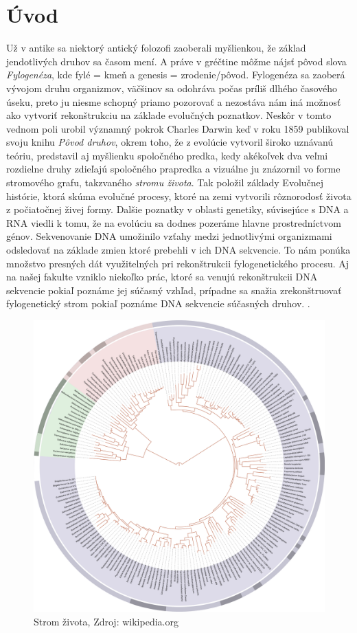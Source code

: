 \chapter*{Úvod}
Už v antike sa niektorý antický folozofi zaoberali myšlienkou, že základ jendotlivých druhov sa časom mení.
A práve v gréčtine môžme nájsť pôvod slova \emph{Fylogenéza}, kde fylé = kmeň a genesis = zrodenie/pôvod.
Fylogenéza sa zaoberá vývojom druhu organizmov, väčšinov sa odohráva počas príliš dlhého časového úseku, 
preto ju niesme schopný priamo pozorovať a nezostáva nám iná možnosť ako vytvoriť rekonštrukciu na základe evolučných poznatkov.
Neskôr v tomto vednom poli urobil významný pokrok Charles Darwin keď v roku 1859 publikoval svoju knihu \emph{Pôvod druhov},
okrem toho, že z evolúcie vytvoril široko uznávanú teóriu, predstavil aj myšlienku spoločného predka, kedy akékoľvek dva veľmi rozdielne
druhy zdieľajú spoločného prapredka a vizuálne ju znázornil vo forme stromového grafu, takzvaného \emph{stromu života}.
Tak položil základy Evolučnej histórie, ktorá skúma evolučné procesy, ktoré
na zemi vytvorili rôznorodosť života z počiatočnej živej formy. 
Dalšie poznatky v oblasti genetiky, súvisejúce s DNA a RNA viedli k tomu, že na evolúciu sa
dodnes pozeráme hlavne prostredníctvom génov.
Sekvenovanie DNA umožinilo vzťahy medzi jednotlivými organizmami odsledovať na základe zmien ktoré prebehli v ich DNA sekvencie.
To nám ponúka množstvo presných dát využitelných pri rekonštrukcii fylogenetického procesu.
Aj na našej fakulte vzniklo niekoľko prác, ktoré sa venujú rekonštrukcii DNA sekvencie pokiaľ poznáme jej súčasný vzhľad,
prípadne sa snažia zrekonštruovať fylogenetický strom pokiaľ poznáme DNA sekvencie súčasných druhov.
\cite{Kovac2011,Hozza2014,Herencsar2014,Vinar2010}. 
\begin{figure}[t]
 \centering
\includegraphics[width=1\textwidth]{images/tol}
\caption{Strom života, Zdroj: wikipedia.org}\label{obr:tol}
\end{figure}

